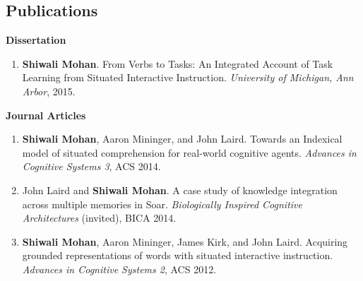 \documentclass[margin,line,11pt]{res}
\begin{document}
\begin{resume}
                  \section{\sc Publications}
                  \textbf{Dissertation}
                  \begin{enumerate}[label=\lbrack D\arabic*\rbrack, leftmargin=*]
                  \item \textbf{Shiwali Mohan}.  From Verbs to Tasks: An Integrated Account of Task Learning from Situated Interactive Instruction. \emph{University of Michigan, Ann Arbor}, 2015.
                  \end{enumerate}
                  \textbf{Journal Articles}
                  \begin{enumerate}[label=\lbrack J\arabic*\rbrack, leftmargin=*]
                  \item \textbf{Shiwali Mohan}, Aaron Mininger, and John Laird. Towards an Indexical model of situated comprehension for real-world cognitive agents. \emph{Advances in Cognitive Systems 3}, ACS 2014.
                  \item John Laird and \textbf{Shiwali Mohan}. A case study of knowledge integration across multiple memories in Soar. \emph{Biologically Inspired Cognitive Architectures} (invited), BICA 2014.
                  \item \textbf{Shiwali Mohan}, Aaron Mininger, James Kirk, and John Laird. Acquiring grounded representations of words with situated interactive instruction. \emph{Advances in Cognitive Systems 2}, ACS 2012.
                  \end{enumerate}


\end{resume}
\end{document}
